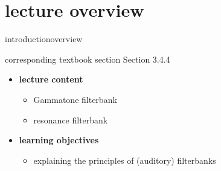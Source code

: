 


\subtitle{Module 3.4.4: Time-Frequency Representations~---~Filterbanks}


	

    \section[overview]{lecture overview}
        \begin{frame}{introduction}{overview}
            \begin{block}{corresponding textbook section}
                    Section 3.4.4
            \end{block}

            \begin{itemize}
                \item   \textbf{lecture content}
                    \begin{itemize}
                        \item   Gammatone filterbank
                        \item   resonance filterbank
                    \end{itemize}
                \bigskip
                \item<2->   \textbf{learning objectives}
                    \begin{itemize}
                        \item   explaining the principles of (auditory) filterbanks
                    \end{itemize}
            \end{itemize}
        \end{frame}
        
